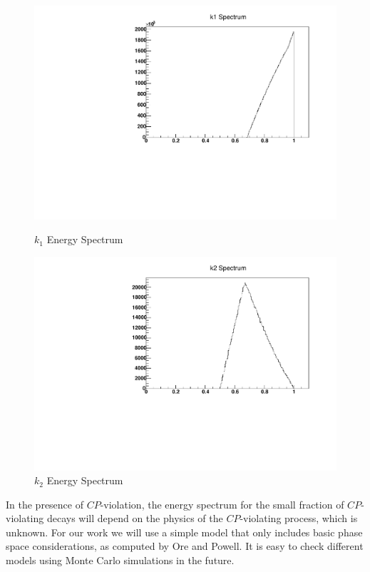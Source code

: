 \begin{figure}[!htb]
  \centering
     \begin{minipage}{0.5\textwidth}
         \includegraphics[width=1.0\linewidth]{k1Spectrum.pdf}
         \caption{$k_{1}$ Energy Spectrum}
     \end{minipage}%
     \centering
     \begin{minipage}{0.5\textwidth}
         \includegraphics[width=1.0\linewidth]{k2Spectrum.pdf}
         \caption{$k_{2}$ Energy Spectrum}
     \end{minipage}
\end{figure}


 In the presence of $CP$-violation, the energy spectrum for the small fraction of $CP$-violating decays will depend on the physics of the $CP$-violating process, which is unknown. For our work we will use a simple model that only includes basic phase space considerations, as computed by Ore and Powell. It is easy to check different models using Monte Carlo simulations in the future.

